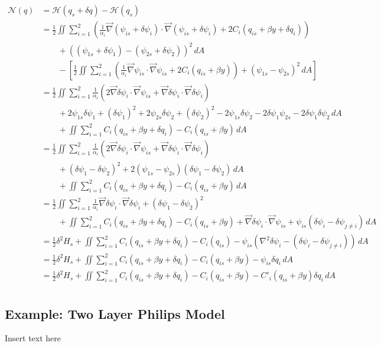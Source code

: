 \documentclass[12pt]{article}
\begin{document}
{{        \begin{align*}
            \mathcal{N}(q)
            & = \mathcal{H}(q_s + \delta q) - \mathcal{H}(q_s) \\
            &= \frac12 \iint \sum_{i=1}^2 \left( \frac{1}{\alpha_i}\vec\nabla (\psi_{is} + \delta\psi_i) \cdot \vec\nabla (\psi_{is} + \delta\psi_i) + 2C_i(q_{is} + \beta y + \delta q_i) \right) \\
            &\quad\quad + ((\psi_{1s} + \delta\psi_1) - (\psi_{2s} + \delta\psi_2))^2 \, dA \\
            &\quad\quad - \left[ \frac12 \iint \sum_{i=1}^2 \left( \frac{1}{\alpha_i}\vec\nabla \psi_{is} \cdot \vec\nabla \psi_{is} + 2C_i(q_{is} + \beta y) \right) + (\psi_{1s} - \psi_{2s})^2 \, dA \right] \\
            &= \frac12 \iint \sum_{i=1}^2 \frac{1}{\alpha_i} (2 \vec\nabla\delta\psi_i \cdot \vec\nabla\psi_{is} + \vec\nabla\delta\psi_i \cdot \vec\nabla\delta\psi_i) \\
            &\quad\quad + 2\psi_{1s}\delta\psi_1 + (\delta\psi_1)^2 + 2\psi_{2s}\delta\psi_2 + (\delta\psi_2)^2 - 2\psi_{1s}\delta\psi_2 - 2\delta\psi_1\psi_{2s} - 2\delta\psi_1\delta\psi_2 \, dA \\
            &\quad\quad + \iint \sum_{i=1}^2 C_i(q_{is} + \beta y + \delta q_i) - C_i(q_{is} + \beta y) \, dA \\
            &= \frac12 \iint \sum_{i=1}^2 \frac{1}{\alpha_i} (2 \vec\nabla\delta\psi_i \cdot \vec\nabla\psi_{is} + \vec\nabla\delta\psi_i \cdot \vec\nabla\delta\psi_i) \\
            &\quad\quad + (\delta\psi_1 - \delta\psi_2)^2 + 2(\psi_{1s} - \psi_{2s})(\delta\psi_1 - \delta\psi_2) \, dA \\
            &\quad\quad + \iint \sum_{i=1}^2 C_i(q_{is} + \beta y + \delta q_i) - C_i(q_{is} + \beta y) \, dA \\
            &= \frac12 \iint \sum_{i=1}^2 \frac{1}{\alpha_i} \vec\nabla\delta\psi_i \cdot \vec\nabla\delta\psi_i + (\delta\psi_1 - \delta\psi_2)^2 \\
            &\quad\quad + \iint \sum_{i=1}^2 C_i(q_{is} + \beta y + \delta q_i) - C_i(q_{is} + \beta y) + \vec\nabla\delta\psi_i \cdot \vec\nabla\psi_{is} + \psi_{is}(\delta\psi_i - \delta\psi_{j \ne i}) \, dA \\
            &= \frac12 \delta^2 H_s + \iint \sum_{i=1}^2 C_i(q_{is} + \beta y + \delta q_i) - C_i(q_{is}) - \psi_{is}(\nabla^2\delta\psi_i - (\delta\psi_i - \delta\psi_{j \ne i})) \, dA \\
            &= \frac12 \delta^2 H_s + \iint \sum_{i=1}^2 C_i(q_{is} + \beta y + \delta q_i) - C_i(q_{is} + \beta y) - \psi_{is}\delta q_i \, dA \\
            &= \frac12 \delta^2 H_s + \iint \sum_{i=1}^2 C_i(q_{is} + \beta y + \delta q_i) - C_i(q_{is} + \beta y) - C'_i(q_{is} + \beta y)\delta q_i \, dA \\
        \end{align*}
    }
    \subsection{Example: Two Layer Philips Model}{
        Insert text here
    }   
}
\end{document}
